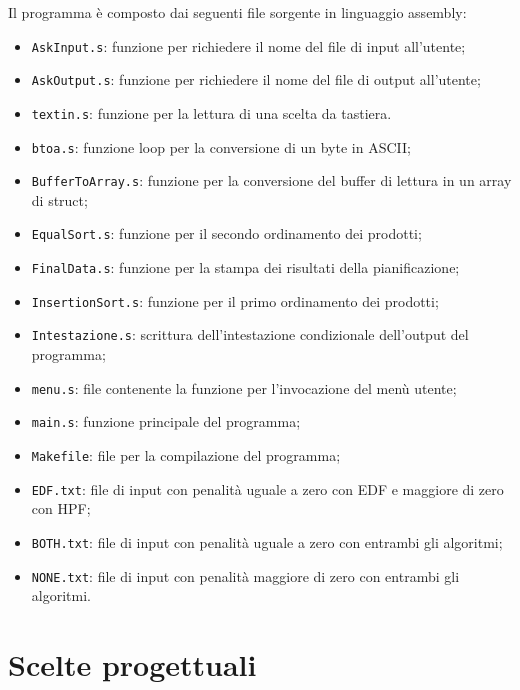 \documentclass[a4paper]{report}
\begin{document}
Il programma è composto dai seguenti file sorgente in linguaggio assembly:
\begin{itemize}
  \item \texttt{AskInput.s}: funzione per richiedere il nome del file di input all'utente;
  \item \texttt{AskOutput.s}: funzione per richiedere il nome del file di output all'utente;
  \item \texttt{textin.s}: funzione per la lettura di una scelta da tastiera.
  \item \texttt{btoa.s}: funzione loop per la conversione di un byte in ASCII;
  \item \texttt{BufferToArray.s}: funzione per la conversione del buffer di lettura in un array di struct;
  \item \texttt{EqualSort.s}: funzione per il secondo ordinamento dei prodotti;
  \item \texttt{FinalData.s}: funzione per la stampa dei risultati della pianificazione;
  \item \texttt{InsertionSort.s}: funzione per il primo ordinamento dei prodotti;
  \item \texttt{Intestazione.s}: scrittura dell'intestazione condizionale dell'output del programma;
  \item \texttt{menu.s}: file contenente la funzione per l'invocazione del menù utente;
  \item \texttt{main.s}: funzione principale del programma;
  

  
\end{itemize}
\begin{itemize}
  \item \texttt{Makefile}: file per la compilazione del programma;
  \item \texttt{EDF.txt}: file di input con penalità uguale a zero con EDF e maggiore di zero con HPF;
  \item \texttt{BOTH.txt}: file di input con penalità uguale a zero con entrambi gli algoritmi;
  \item \texttt{NONE.txt}: file di input con penalità maggiore di zero con entrambi gli algoritmi.
\end{itemize}

\section{Scelte progettuali}
\end{document}
